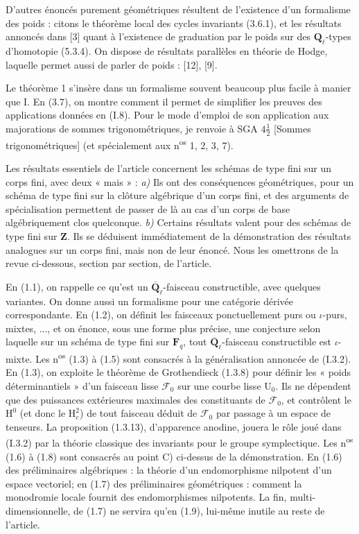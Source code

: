 \documentclass[11pt,leqno]{article}
\begin{document}
D’autres énoncés purement géométriques résultent de l’existence d’un formalisme des poids : citons le théorème local des cycles invariants (3.6.1), et les résultats annoncés dans [3] quant à l’existence de graduation par le poids sur des \(\mathbf{Q}_\ell\)-types d’homotopie (5.3.4). On dispose de résultats parallèles en théorie de Hodge, laquelle permet aussi de parler de poids : [12], [9].

Le théorème 1 s’insère dans un formalisme souvent beaucoup plus facile à manier que I. En (3.7), on montre comment il permet de simplifier les preuves des applications données en (I.8). Pour le mode d’emploi de son application aux majorations de sommes trigonométriques, je renvoie à SGA \(4\frac{1}{2}\) [Sommes trigonométriques] (et spécialement aux n\textsuperscript{os} 1, 2, 3, 7).

Les résultats essentiels de l’article concernent les schémas de type fini sur un corps fini, avec deux « mais » : \textit{a)} Ils ont des conséquences géométriques, pour un schéma de type fini sur la clôture algébrique d’un corps fini, et des arguments de spécialisation permettent de passer de là au cas d’un corps de base algébriquement clos quelconque. \textit{b)} Certains résultats valent pour des schémas de type fini sur \(\mathbf{Z}\). Ils se déduisent immédiatement de la démonstration des résultats analogues sur un corps fini, mais non de leur énoncé. Nous les omettrons de la revue ci-dessous, section par section, de l’article.

En (1.1), on rappelle ce qu’est un \(\overline{\mathbf{Q}}_\ell\)-faisceau constructible, avec quelques variantes. On donne aussi un formalisme pour une catégorie dérivée correspondante. En (1.2), on définit les faisceaux ponctuellement purs ou \(\iota\)-purs, mixtes, ..., et on énonce, sous une forme plus précise, une conjecture selon laquelle sur un schéma de type fini sur \(\mathbf{F}_q\), tout \(\overline{\mathbf{Q}}_\ell\)-faisceau constructible est \(\iota\)-mixte. Les n\textsuperscript{os} (1.3) à (1.5) sont consacrés à la généralisation annoncée de (I.3.2). En (1.3), on exploite le théorème de Grothendieck (1.3.8) pour définir les « poids déterminantiels » d’un faisceau lisse \(\mathscr{F}_0\) sur une courbe lisse \(\mathrm{U}_0\). Ils ne dépendent que des puissances extérieures maximales des constituants de \(\mathscr{F}_0\), et contrôlent le \(\mathrm{H}^0\) (et donc le \(\mathrm{H}_c^2\)) de tout faisceau déduit de \(\mathscr{F}_0\) par passage à un espace de tenseurs. La proposition (1.3.13), d’apparence anodine, jouera le rôle joué dans (I.3.2) par la théorie classique des invariants pour le groupe symplectique. Les n\textsuperscript{os} (1.6) à (1.8) sont consacrés au point C) ci-dessus de la démonstration. En (1.6) des préliminaires algébriques : la théorie d’un endomorphisme nilpotent d’un espace vectoriel; en (1.7) des préliminaires géométriques : comment la monodromie locale fournit des endomorphismes nilpotents. La fin, multi-dimensionnelle, de (1.7) ne servira qu’en (1.9), lui-même inutile au reste de l’article.
\end{document}
